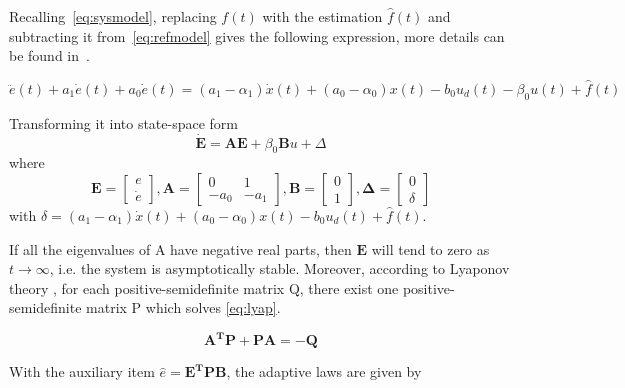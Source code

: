 Recalling~\eqref{eq:sysmodel}, replacing $f(t)$ with the estimation $\hat{f}(t)$ and subtracting it from~\eqref{eq:refmodel} gives the following expression, more details can be found in~\citep{Qingson:2016}.

\begin{equation}
  \ddot{e}(t) + a_1\dot{e}(t) + a_0\dot{e}(t) =  (a_1-\alpha_1)\dot{x}(t) + (a_0-\alpha_0)x(t) - b_0u_d(t) - \beta_0u(t) + \hat{f}(t)
\end{equation}

Transforming it into state-space form
\begin{equation}
  \label{eq:stateSpaceError}
  \mathbf{\dot{E} = AE} + \beta_0\mathbf{B}u + \Delta
\end{equation}
where
\begin{equation}
  \label{eq:matrices}
  \mathbf{E} =
    \begin{bmatrix}
       e\\[0.3em]
       \dot{e}
     \end{bmatrix},
  \mathbf{A} =
    \begin{bmatrix}
       0 & 1\\[0.3em]
       -a_0 & -a_1
     \end{bmatrix},
  \mathbf{B} =
    \begin{bmatrix}
        0\\[0.3em]
        1
    \end{bmatrix},
    \mathbf{\Delta} =
      \begin{bmatrix}
          0\\[0.3em]
          \delta
      \end{bmatrix}
\end{equation}
with $\delta = (a_1-\alpha_1)\dot{x}(t) + (a_0-\alpha_0)x(t) - b_0u_d(t) + \hat{f}(t)$.

If all the eigenvalues of A have negative real parts, then $\mathbf{E}$ will tend to zero as  $t \to \infty$, i.e. the system is asymptotically stable. Moreover, according to Lyaponov theory \citep{Ljung:2003}, for each positive-semidefinite matrix Q, there exist one positive-semidefinite matrix P which solves \eqref{eq:lyap}.

\begin{equation}
  \label{eq:lyap}
  \mathbf{A^TP + PA = -Q}
\end{equation}

With the auxiliary item $\hat{e} = \mathbf{E^TPB}$, the adaptive laws are given by

